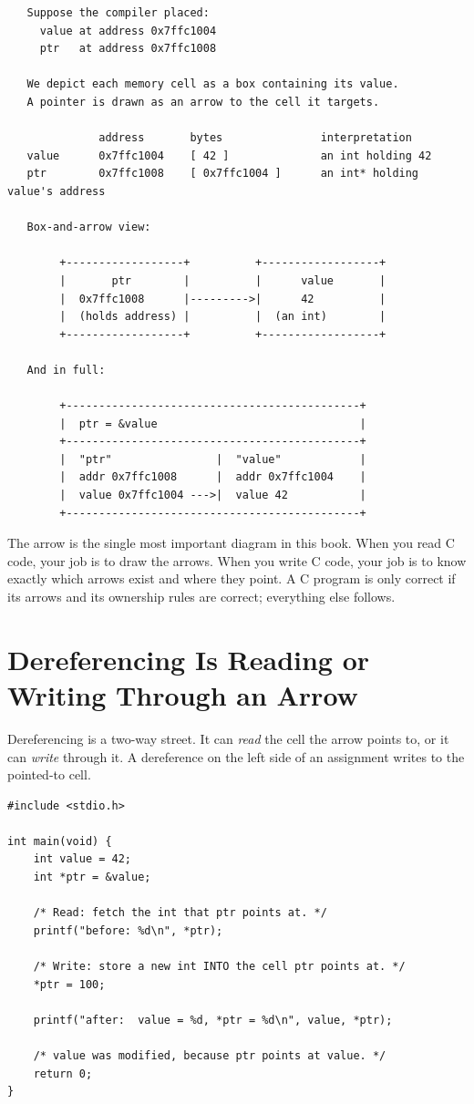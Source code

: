 \begin{verbatim}
   Suppose the compiler placed:
     value at address 0x7ffc1004
     ptr   at address 0x7ffc1008

   We depict each memory cell as a box containing its value.
   A pointer is drawn as an arrow to the cell it targets.

              address       bytes               interpretation
   value      0x7ffc1004    [ 42 ]              an int holding 42
   ptr        0x7ffc1008    [ 0x7ffc1004 ]      an int* holding value's address

   Box-and-arrow view:

        +------------------+          +------------------+
        |       ptr        |          |      value       |
        |  0x7ffc1008      |--------->|      42          |
        |  (holds address) |          |  (an int)        |
        +------------------+          +------------------+

   And in full:

        +---------------------------------------------+
        |  ptr = &value                               |
        +---------------------------------------------+
        |  "ptr"                |  "value"            |
        |  addr 0x7ffc1008      |  addr 0x7ffc1004    |
        |  value 0x7ffc1004 --->|  value 42           |
        +---------------------------------------------+
\end{verbatim}

The arrow is the single most important diagram in this book. When you
read C code, your job is to draw the arrows. When you write C code,
your job is to know exactly which arrows exist and where they point.
A C program is only correct if its arrows and its ownership rules are
correct; everything else follows.

\section{Dereferencing Is Reading or Writing Through an Arrow}

Dereferencing is a two-way street. It can \emph{read} the cell the arrow
points to, or it can \emph{write} through it. A dereference on the left
side of an assignment writes to the pointed-to cell.

\begin{lstlisting}[caption={Reading and writing through a pointer.}]
#include <stdio.h>

int main(void) {
    int value = 42;
    int *ptr = &value;

    /* Read: fetch the int that ptr points at. */
    printf("before: %d\n", *ptr);

    /* Write: store a new int INTO the cell ptr points at. */
    *ptr = 100;

    printf("after:  value = %d, *ptr = %d\n", value, *ptr);

    /* value was modified, because ptr points at value. */
    return 0;
}
\end{lstlisting}


